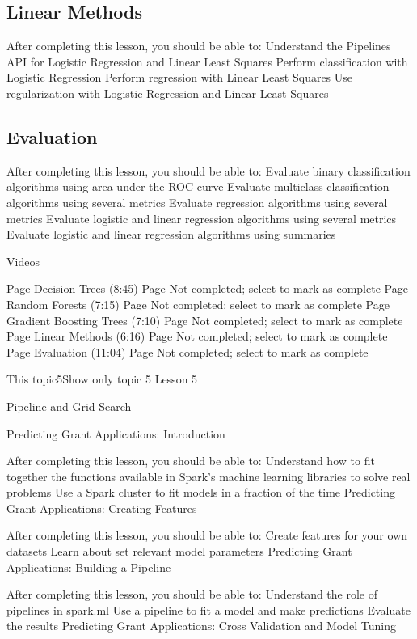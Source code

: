 \subsection{ Linear Methods }

After completing this lesson, you should be able to:
Understand the Pipelines API for Logistic Regression and Linear Least Squares
Perform classification with Logistic Regression
Perform regression with Linear Least Squares
Use regularization with Logistic Regression and Linear Least Squares

\subsection{Evaluation}

After completing this lesson, you should be able to:
Evaluate binary classification algorithms using area under the ROC curve
Evaluate multiclass classification algorithms using several metrics
Evaluate regression algorithms using several metrics
Evaluate logistic and linear regression algorithms using several metrics
Evaluate logistic and linear regression algorithms using summaries
 

Videos

Page Decision Trees (8:45) Page Not completed; select to mark as complete
Page Random Forests (7:15) Page Not completed; select to mark as complete
Page Gradient Boosting Trees (7:10) Page Not completed; select to mark as complete
Page Linear Methods (6:16) Page Not completed; select to mark as complete
Page Evaluation (11:04) Page Not completed; select to mark as complete

This topic5Show only topic 5
Lesson 5

Pipeline and Grid Search

 

Predicting Grant Applications: Introduction

After completing this lesson, you should be able to:
Understand how to fit together the functions available in Spark’s machine learning libraries to solve real problems
Use a Spark cluster to fit models in a fraction of the time
Predicting Grant Applications: Creating Features

After completing this lesson, you should be able to:
Create features for your own datasets
Learn about set relevant model parameters
Predicting Grant Applications: Building a Pipeline

After completing this lesson, you should be able to:
Understand the role of pipelines in spark.ml
Use a pipeline to fit a model and make predictions
Evaluate the results
Predicting Grant Applications: Cross Validation and Model Tuning

